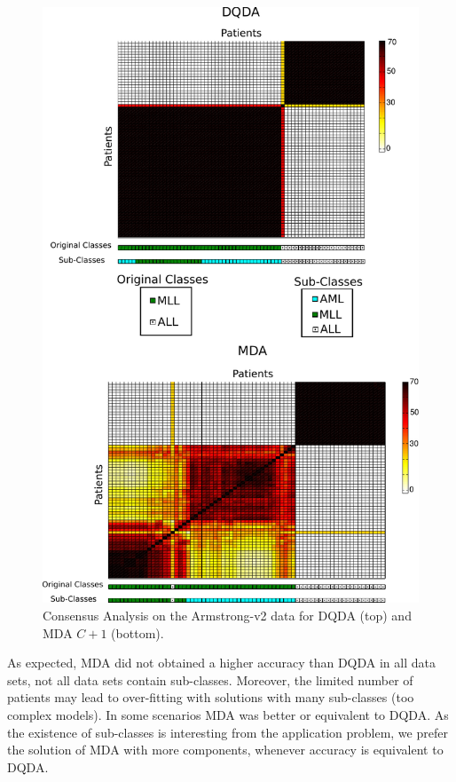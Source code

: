 \documentclass[runningheads,a4paper]{llncs}
\begin{document}
\begin{figure}
\centerline{\includegraphics[width=1.0\columnwidth]{figs/DQDA_MDA2}}
\caption{Consensus Analysis on the Armstrong-v2 data for DQDA (top) and MDA $C+1$ (bottom). 
\label{fig:consensus}} 
\end{figure}


As expected, MDA did not obtained a higher accuracy than DQDA in all
data sets, not all data sets contain sub-classes. Moreover, the
limited number of patients may lead to over-fitting with solutions
with many sub-classes (too complex models).  In some scenarios MDA was
better or equivalent to DQDA.  As the existence of sub-classes is
interesting from the application problem, we prefer the solution of
MDA with more components, whenever accuracy is equivalent to DQDA.
\end{document}
